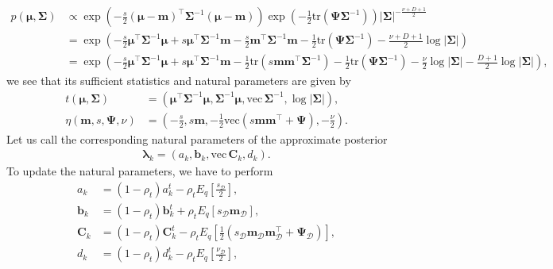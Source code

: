 \documentclass[a4paper]{article}
\begin{document}
			\begin{align}
				p(\bm{\mu}, \bm{\Sigma})
				&\propto \exp\left( -\frac{s}{2} (\bm{\mu} - \mathbf{m})^\top \bm{\Sigma}^{-1} (\bm{\mu} - \mathbf{m}) \right)
				\exp\left( -\frac{1}{2} \text{tr}(\bm{\Psi}\bm{\Sigma}^{-1}) \right) |\bm{\Sigma}|^{-\frac{\nu + D + 1}{2}} \\
				&= \exp\left( -\frac{s}{2} \bm{\mu}^\top \bm{\Sigma}^{-1} \bm{\mu} + s \bm{\mu}^\top \bm{\Sigma}^{-1} \mathbf{m}
				- \frac{s}{2} \mathbf{m}^\top\bm{\Sigma}^{-1}\mathbf{m} - \frac{1}{2} \text{tr}(\bm{\Psi}\bm{\Sigma}^{-1})
				- \frac{\nu + D + 1}{2} \log |\bm{\Sigma}| \right) \\
				&= \exp\left( -\frac{s}{2} \bm{\mu}^\top \bm{\Sigma}^{-1} \bm{\mu} + s \bm{\mu}^\top \bm{\Sigma}^{-1} \mathbf{m}
				- \frac{1}{2} \text{tr}(s\mathbf{m}\mathbf{m}^\top\bm{\Sigma}^{-1}) - \frac{1}{2} \text{tr}(\bm{\Psi}\bm{\Sigma}^{-1})
				- \frac{\nu}{2} \log |\bm{\Sigma}| - \frac{D + 1}{2} \log |\bm{\Sigma}| \right),
			\end{align}
			we see that its sufficient statistics and natural parameters are given by
			\begin{align}
				t(\bm{\mu}, \bm{\Sigma})
				&= \left( \bm{\mu}^\top \bm{\Sigma}^{-1} \bm{\mu}, \bm{\Sigma}^{-1}\bm{\mu}, \text{vec}\, \bm{\Sigma}^{-1}, \log|\bm{\Sigma}| \right), \\
				\eta(\mathbf{m}, s, \bm{\Psi}, \nu)
				&= \left( -\frac{s}{2}, s\mathbf{m}, -\frac{1}{2} \text{vec}(s\mathbf{m}\mathbf{m}^\top + \bm{\Psi}), -\frac{\nu}{2} \right).
			\end{align}
			Let us call the corresponding natural parameters of the approximate posterior
			\begin{align}
				\bm{\lambda}_k = (a_k, \mathbf{b}_k, \text{vec} \, \mathbf{C}_k, d_k).
			\end{align}
			To update the natural parameters, we have to perform
			\begin{align}
				a_k &= (1 - \rho_t) a_k^t - \rho_t E_q\left[ \frac{s_\mathcal{D}}{2} \right], \\
				\mathbf{b}_k &= (1 - \rho_t) \mathbf{b}_k^t + \rho_t E_q[s_\mathcal{D} \mathbf{m}_\mathcal{D}], \\
				\label{eq:update_C}
				\mathbf{C}_k &= (1 - \rho_t) \mathbf{C}_k^t - \rho_t E_q\left[\frac{1}{2} \left( s_\mathcal{D} \mathbf{m}_\mathcal{D}\mathbf{m}_\mathcal{D}^\top + \bm{\Psi}_\mathcal{D} \right)\right], \\
				d_k &= (1 - \rho_t) d_k^t - \rho_t E_q\left[\frac{\nu_\mathcal{D}}{2}\right],
			\end{align}
\end{document}

